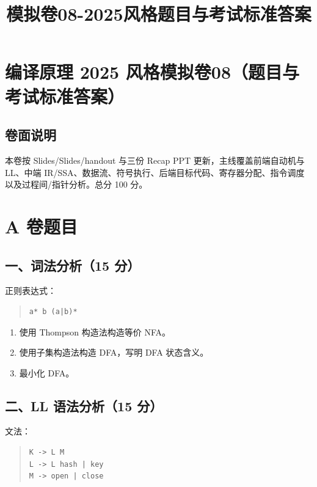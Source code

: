\documentclass[UTF8,zihao=-4]{ctexart}
\title{模拟卷08-2025风格题目与考试标准答案}
\author{}
\date{}
\begin{document}
\maketitle
\setcounter{tocdepth}{1}
\tableofcontents
\newpage
\section{编译原理 2025 风格模拟卷08（题目与考试标准答案）}


\subsection{卷面说明}


本卷按 Slides/Slides/handout 与三份 Recap PPT 更新，主线覆盖前端自动机与 LL、中端 IR/SSA、数据流、符号执行、后端目标代码、寄存器分配、指令调度以及过程间/指针分析。总分 100 分。


\section{A 卷题目}


\subsection{一、词法分析（15 分）}


正则表达式：


\begin{quote}
\footnotesize
\begin{verbatim}
a* b (a|b)*
\end{verbatim}
\end{quote}


\begin{enumerate}
\item 使用 Thompson 构造法构造等价 NFA。
\item 使用子集构造法构造 DFA，写明 DFA 状态含义。
\item 最小化 DFA。
\end{enumerate}


\subsection{二、LL 语法分析（15 分）}


文法：


\begin{quote}
\footnotesize
\begin{verbatim}
K -> L M
L -> L hash | key
M -> open | close
\end{verbatim}
\end{quote}
\end{document}
